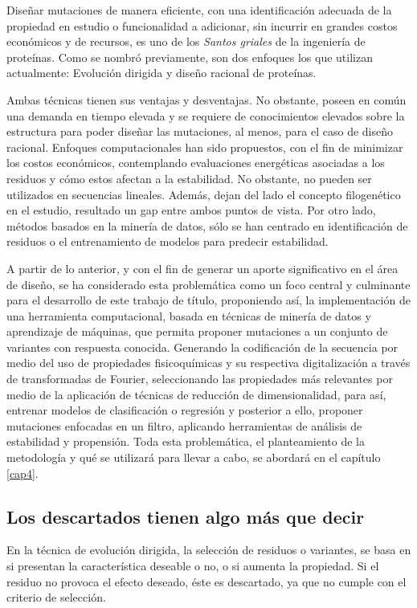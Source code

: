Diseñar mutaciones de manera eficiente, con una identificación adecuada de la propiedad en estudio o funcionalidad a adicionar, sin incurrir en grandes costos económicos y de recursos, es uno de los \textit{Santos griales} de la ingeniería de proteínas. Como se nombró previamente, son dos enfoques los que utilizan actualmente: Evolución dirigida y diseño racional de proteínas.

Ambas técnicas tienen sus ventajas y desventajas. No obstante, poseen en común una demanda en tiempo elevada y se requiere de conocimientos elevados sobre la estructura para poder diseñar las mutaciones, al menos, para el caso de diseño racional. Enfoques computacionales han sido propuestos, con el fin de minimizar los costos económicos, contemplando evaluaciones energéticas asociadas a los residuos y cómo estos afectan a la estabilidad. No obstante, no pueden ser utilizados en secuencias lineales. Además, dejan del lado el concepto filogenético en el estudio, resultado un gap entre ambos puntos de vista. Por otro lado, métodos basados en la minería de datos, sólo se han centrado en identificación de residuos o el entrenamiento de modelos para predecir estabilidad.

A partir de lo anterior, y con el fin de generar un aporte significativo en el área de diseño, se ha considerado esta problemática como un foco central y culminante para el desarrollo de este trabajo de título, proponiendo así, la implementación de una herramienta computacional, basada en técnicas de minería de datos y aprendizaje de máquinas, que permita proponer mutaciones a un conjunto de variantes con respuesta conocida. Generando la codificación de la secuencia por medio del uso de propiedades fisicoquímicas y su respectiva digitalización a través de transformadas de Fourier, seleccionando las propiedades más relevantes por medio de la aplicación de técnicas de reducción de dimensionalidad, para así, entrenar modelos de clasificación o regresión y posterior a ello, proponer mutaciones enfocadas en un filtro, aplicando herramientas de análisis de estabilidad y propensión. Toda esta problemática, el planteamiento de la metodología y qué se utilizará para llevar a cabo, se abordará en el capítulo \ref{cap4}.


\subsection{Los descartados tienen algo más que decir}

En la técnica de evolución dirigida, la selección de residuos o variantes, se basa en si presentan la característica deseable o no, o si aumenta la propiedad. Si el residuo no provoca el efecto deseado, éste es descartado, ya que no cumple con el criterio de selección.

